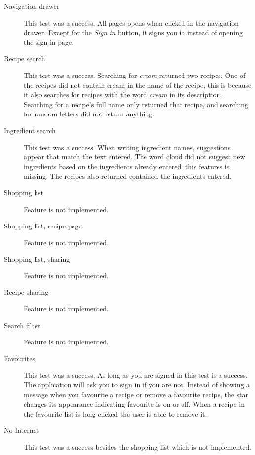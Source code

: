 \begin{description}
\item[Navigation drawer] This test was a success. All pages opens when clicked in the navigation drawer. Except for the \textit{Sign in} button, it signs you in instead of opening the sign in page.
\item[Recipe search] This test was a success. Searching for \textit{cream} returned two recipes. One of the recipes did not contain cream in the name of the recipe, this is because it also searches for recipes with the word \textit{cream} in its description. Searching for a recipe's full name only returned that recipe, and searching for random letters did not return anything.
\item[Ingredient search] This test was a success. When writing ingredient names, suggestions appear that match the text entered. The word cloud did not suggest new ingredients based on the ingredients already entered, this features is missing. The recipes also returned contained the ingredients entered.
\item[Shopping list] Feature is not implemented.
\item[Shopping list, recipe page] Feature is not implemented.
\item[Shopping list, sharing] Feature is not implemented.
\item[Recipe sharing] Feature is not implemented.
\item[Search filter] Feature is not implemented.
\item[Favourites] This test was a success. As long as you are signed in this test is a success. The application will ask you to sign in if you are not. Instead of showing a message when you favourite a recipe or remove a favourite recipe, the star changes its appearance indicating favourite is on or off. When a recipe in the favourite list is long clicked the user is able to remove it.
\item[No Internet] This test was a success besides the shopping list which is not implemented.
\end{description}